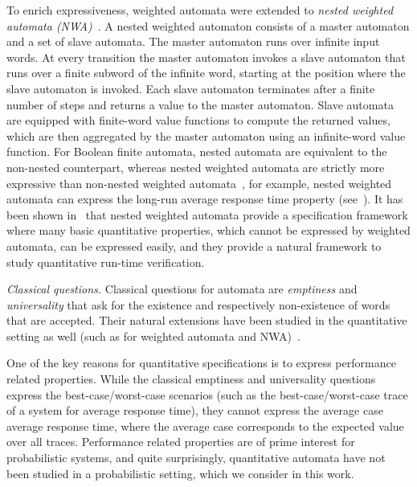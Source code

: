 \documentclass{lmcs}
\begin{document}
\smallskip{}
To enrich expressiveness, weighted automata were extended
to \emph{nested weighted automata (NWA)}~\cite{nested}.
A nested weighted automaton consists of a master automaton and a set
of slave automata. The master automaton runs over infinite input words.
At every transition the master automaton invokes a slave automaton that runs
over a finite subword of the infinite word, starting at the position where
the slave automaton is invoked.
Each slave automaton terminates after a finite number of steps and returns
a value to the master automaton.
Slave automata are equipped with finite-word value functions to compute the returned values, which are then
aggregated by the master automaton using an infinite-word value function.
For Boolean finite automata, nested automata are equivalent to the non-nested
counterpart, whereas nested weighted automata are strictly more expressive
than non-nested weighted automata~\cite{nested}, for example,
nested weighted automata can express the long-run average response
time property (see~\cite[Example~5]{nested}).
It has been shown in~\cite{nested} that nested weighted automata provide a
specification framework where many basic quantitative properties,
which cannot be expressed by weighted automata, can be expressed easily,
and they provide a natural framework to study quantitative run-time
verification.



\smallskip\noindent\emph{Classical questions.}
Classical questions for automata are \emph{emptiness} and \emph{universality}
that ask for the existence and respectively non-existence of words that are accepted.
Their natural extensions have been studied in the quantitative setting as
well (such as for weighted automata and NWA)~\cite{Chatterjee08quantitativelanguages,nested}.



\smallskip{}
One of the key reasons for quantitative specifications is to express performance
related properties.
While the classical emptiness and universality questions express the best-case/worst-case scenarios (such as the best-case/worst-case trace of a system for average response time),
they cannot express the average case average response time, where
the average case corresponds to the expected value over all traces.
Performance related properties are of prime interest for probabilistic systems,
and quite surprisingly, quantitative automata have not been studied in a
probabilistic setting, which we consider in this work.
\end{document}
